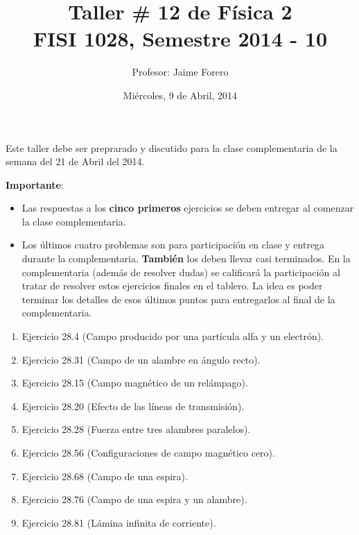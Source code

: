 \documentclass{article}
\title{Taller \# 12 de F\'isica 2\\ FISI 1028, Semestre 2014 - 10}
\author{Profesor: Jaime Forero}
\date{Mi\'ercoles, 9 de Abril, 2014}
\begin{document}
\maketitle
\thispagestyle{empty}

\noindent

Este taller debe ser preprarado y discutido para la clase
complementaria de la semana del 21 de Abril del 2014. 

\noindent
{\bf Importante}:
\begin{itemize}

\item
Las respuestas a los {\bf cinco primeros} ejercicios se deben entregar
al comenzar la clase complementaria. 
\item 

Los \'ultimos cuatro problemas son para participaci\'on en clase y entrega
durante la complementaria. {\bf{Tambi\'en}} los deben llevar casi
terminados. En la complementaria (adem\'as de resolver dudas) se
calificar\'a la participaci\'on al tratar de resolver estos ejercicios
finales en el tablero. La idea es poder terminar los  detalles de esos
\'ultimos puntos para entregarlos al final de la complementaria.
\end{itemize}

\begin{enumerate}

\item
Ejercicio 28.4 (Campo producido por una part\'icula alfa y  un electr\'on).

\item
Ejercicio 28.31 (Campo de un alambre en \'angulo recto).

\item 
Ejercicio 28.15 (Campo magn\'etico de un rel\'ampago).

\item 
Ejercicio 28.20 (Efecto de las l\'ineas de transmisi\'on).

\item
Ejercicio 28.28 (Fuerza entre tres alambres paralelos).

\item 
Ejercicio 28.56 (Configuraciones de campo magn\'etico cero).

\item
Ejercicio 28.68 (Campo de una espira).

\item 
Ejercicio 28.76 (Campo de una espira y un alambre).

\item
Ejercicio 28.81 (L\'amina infinita de corriente).

\end{enumerate}
\end{document}
